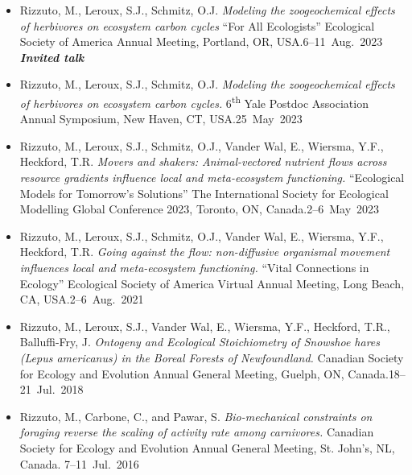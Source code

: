 


\begin{itemize}
  \item \textcolor{awesome}{Rizzuto, M.}, Leroux, S.J., Schmitz, O.J. \emph{Modeling the zoogeochemical effects of herbivores on ecosystem carbon cycles} ``For All Ecologists'' Ecological Society of America Annual Meeting, Portland, OR, USA.\hfill 6--11~Aug.~2023 \\ \null\hfill\textbf{\textit{Invited talk}}  
  \item \textcolor{awesome}{Rizzuto, M.}, Leroux, S.J., Schmitz, O.J. \emph{Modeling the zoogeochemical effects of herbivores on ecosystem carbon cycles.} 6\textsuperscript{th} Yale Postdoc Association Annual Symposium, New Haven, CT, USA.\hfill 25~May~2023
  \item \textcolor{awesome}{Rizzuto, M.}, Leroux, S.J., Schmitz, O.J., Vander Wal, E., Wiersma, Y.F., Heckford, T.R. \emph{Movers and shakers: Animal-vectored nutrient flows across resource gradients influence local and meta-ecosystem functioning.} ``Ecological Models for Tomorrow's Solutions'' The International Society for Ecological Modelling Global Conference 2023, Toronto, ON, Canada.\hfill 2--6~May~2023
  \item \textcolor{awesome}{Rizzuto, M.}, Leroux, S.J., Schmitz, O.J., Vander Wal, E., Wiersma, Y.F., Heckford, T.R. \emph{Going against the flow: non-diffusive organismal movement influences local and meta-ecosystem functioning.} ``Vital Connections in Ecology'' Ecological Society of America Virtual Annual Meeting, Long Beach, CA, USA.\hfill 2--6~Aug.~2021
  \item \textcolor{awesome}{Rizzuto, M.}, Leroux, S.J., Vander Wal, E., Wiersma, Y.F., Heckford, T.R., Balluffi-Fry, J. \emph{Ontogeny and Ecological Stoichiometry of Snowshoe hares (Lepus americanus) in the Boreal Forests of Newfoundland.} Canadian Society for Ecology and Evolution Annual General Meeting, Guelph, ON, Canada.\hfill 18--21~Jul.~2018 
  \item \textcolor{awesome}{Rizzuto, M.}, Carbone, C., and Pawar, S. \emph{Bio-mechanical constraints on foraging reverse the scaling of activity rate among carnivores.} Canadian Society for Ecology and Evolution Annual General Meeting, St. John's, NL,\\ Canada. \hfill 7--11~Jul.~2016
\end{itemize}

